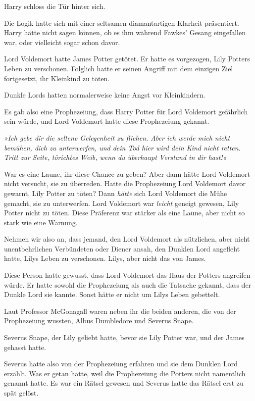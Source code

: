 {Harry schloss die Tür hinter sich.

Die Logik hatte sich mit einer seltsamen diamantartigen Klarheit präsentiert. Harry hätte nicht sagen können, ob es ihm während Fawkes' Gesang eingefallen war, oder vielleicht sogar schon davor.

Lord Voldemort hatte James Potter getötet. Er hatte es vorgezogen, Lily Potters Leben zu verschonen. Folglich hatte er seinen Angriff mit dem einzigen Ziel fortgesetzt, ihr Kleinkind zu töten.

Dunkle Lords hatten normalerweise keine Angst vor Kleinkindern.

Es gab also eine Prophezeiung, dass Harry Potter für Lord Voldemort gefährlich sein würde, und Lord Voldemort hatte diese Prophezeiung gekannt.

\emph{»Ich gebe dir die seltene Gelegenheit zu fliehen. Aber ich werde mich nicht bemühen, dich zu unterwerfen, und dein Tod hier wird dein Kind nicht retten. Tritt zur Seite, törichtes Weib, wenn du überhaupt Verstand in dir hast!«}

War es eine Laune, ihr diese Chance zu geben? Aber dann hätte Lord Voldemort nicht versucht, sie zu überreden. Hatte die Prophezeiung Lord Voldemort davor gewarnt, Lily Potter zu töten? Dann \emph{hätte} sich Lord Voldemort die Mühe gemacht, sie zu unterwerfen. Lord Voldemort war \emph{leicht} geneigt gewesen, Lily Potter nicht zu töten. Diese Präferenz war stärker als eine Laune, aber nicht so stark wie eine Warnung.

Nehmen wir also an, dass jemand, den Lord Voldemort als nützlichen, aber nicht unentbehrlichen Verbündeten oder Diener ansah, den Dunklen Lord angefleht hatte, Lilys Leben zu verschonen. Lilys, aber nicht das von James.

Diese Person hatte gewusst, dass Lord Voldemort das Haus der Potters angreifen würde. Er hatte sowohl die Prophezeiung als auch die Tatsache gekannt, dass der Dunkle Lord sie kannte. Sonst hätte er nicht um Lilys Leben gebettelt.

Laut Professor McGonagall waren neben ihr die beiden anderen, die von der Prophezeiung wussten, Albus Dumbledore und Severus Snape.

Severus Snape, der Lily geliebt hatte, bevor sie Lily Potter war, und der James gehasst hatte.

Severus hatte also von der Prophezeiung erfahren und sie dem Dunklen Lord erzählt. Was er getan hatte, weil die Prophezeiung die Potters nicht namentlich genannt hatte. Es war ein Rätsel gewesen und Severus hatte das Rätsel erst zu spät gelöst.

}
